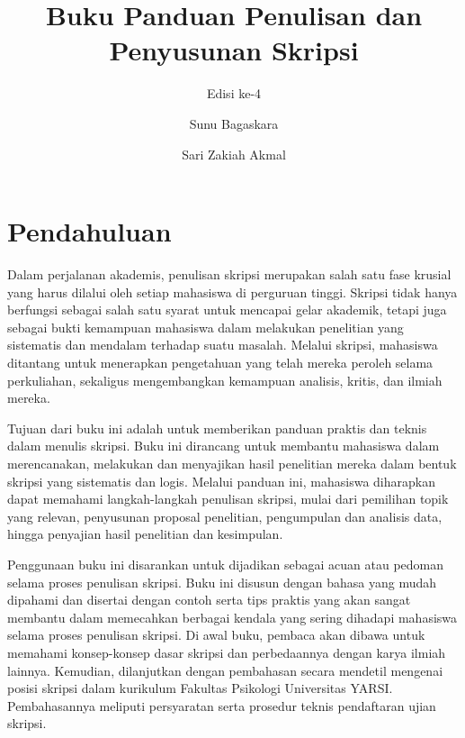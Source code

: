 \documentclass[
  indonesian,
  letterpaper,
]{scrbook}
\title{Buku Panduan Penulisan dan Penyusunan Skripsi}
\subtitle{Edisi ke-4}
\author{Sunu Bagaskara \and Sari Zakiah Akmal}
\date{}
\renewcommand*\contentsname{Daftar Isi}
\newcommand\contentsname{Daftar Isi}
\begin{document}
\frontmatter
\maketitle

\renewcommand*\contentsname{Daftar Isi}
{
\hypersetup{linkcolor=}
\setcounter{tocdepth}{1}
\tableofcontents
}

\mainmatter
{}

\chapter*{\texorpdfstring{\textbf{Pendahuluan}}{Pendahuluan}}\label{pendahuluan}


Dalam perjalanan akademis, penulisan skripsi merupakan salah satu fase
krusial yang harus dilalui oleh setiap mahasiswa di perguruan tinggi.
Skripsi tidak hanya berfungsi sebagai salah satu syarat untuk mencapai
gelar akademik, tetapi juga sebagai bukti kemampuan mahasiswa dalam
melakukan penelitian yang sistematis dan mendalam terhadap suatu
masalah. Melalui skripsi, mahasiswa ditantang untuk menerapkan
pengetahuan yang telah mereka peroleh selama perkuliahan, sekaligus
mengembangkan kemampuan analisis, kritis, dan ilmiah mereka.

Tujuan dari buku ini adalah untuk memberikan panduan praktis dan teknis
dalam menulis skripsi. Buku ini dirancang untuk membantu mahasiswa dalam
merencanakan, melakukan dan menyajikan hasil penelitian mereka dalam
bentuk skripsi yang sistematis dan logis. Melalui panduan ini, mahasiswa
diharapkan dapat memahami langkah-langkah penulisan skripsi, mulai dari
pemilihan topik yang relevan, penyusunan proposal penelitian,
pengumpulan dan analisis data, hingga penyajian hasil penelitian dan
kesimpulan.

Penggunaan buku ini disarankan untuk dijadikan sebagai acuan atau
pedoman selama proses penulisan skripsi. Buku ini disusun dengan bahasa
yang mudah dipahami dan disertai dengan contoh serta tips praktis yang
akan sangat membantu dalam memecahkan berbagai kendala yang sering
dihadapi mahasiswa selama proses penulisan skripsi. Di awal buku,
pembaca akan dibawa untuk memahami konsep-konsep dasar skripsi dan
perbedaannya dengan karya ilmiah lainnya. Kemudian, dilanjutkan dengan
pembahasan secara mendetil mengenai posisi skripsi dalam kurikulum
Fakultas Psikologi Universitas YARSI. Pembahasannya meliputi persyaratan
serta prosedur teknis pendaftaran ujian skripsi.
\end{document}
